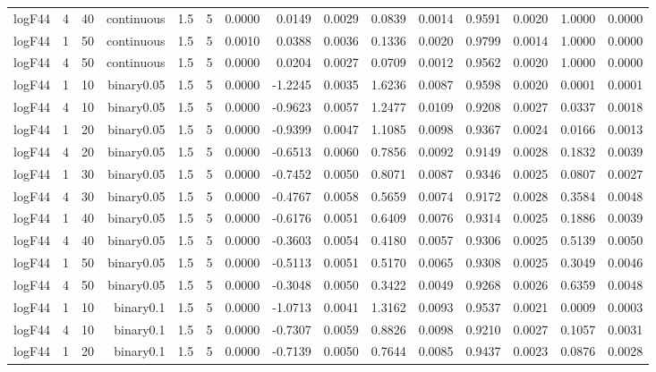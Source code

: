 \begin{longtable}{rrrrrrrrrrrrrrr}
  logF44 & 4 & 40 & continuous & 1.5 & 5 & 0.0000 & 0.0149 & 0.0029 & 0.0839 & 0.0014 & 0.9591 & 0.0020 & 1.0000 & 0.0000 \\ 
  logF44 & 1 & 50 & continuous & 1.5 & 5 & 0.0010 & 0.0388 & 0.0036 & 0.1336 & 0.0020 & 0.9799 & 0.0014 & 1.0000 & 0.0000 \\ 
  logF44 & 4 & 50 & continuous & 1.5 & 5 & 0.0000 & 0.0204 & 0.0027 & 0.0709 & 0.0012 & 0.9562 & 0.0020 & 1.0000 & 0.0000 \\ 
  logF44 & 1 & 10 & binary0.05 & 1.5 & 5 & 0.0000 & -1.2245 & 0.0035 & 1.6236 & 0.0087 & 0.9598 & 0.0020 & 0.0001 & 0.0001 \\ 
  logF44 & 4 & 10 & binary0.05 & 1.5 & 5 & 0.0000 & -0.9623 & 0.0057 & 1.2477 & 0.0109 & 0.9208 & 0.0027 & 0.0337 & 0.0018 \\ 
  logF44 & 1 & 20 & binary0.05 & 1.5 & 5 & 0.0000 & -0.9399 & 0.0047 & 1.1085 & 0.0098 & 0.9367 & 0.0024 & 0.0166 & 0.0013 \\ 
  logF44 & 4 & 20 & binary0.05 & 1.5 & 5 & 0.0000 & -0.6513 & 0.0060 & 0.7856 & 0.0092 & 0.9149 & 0.0028 & 0.1832 & 0.0039 \\ 
  logF44 & 1 & 30 & binary0.05 & 1.5 & 5 & 0.0000 & -0.7452 & 0.0050 & 0.8071 & 0.0087 & 0.9346 & 0.0025 & 0.0807 & 0.0027 \\ 
  logF44 & 4 & 30 & binary0.05 & 1.5 & 5 & 0.0000 & -0.4767 & 0.0058 & 0.5659 & 0.0074 & 0.9172 & 0.0028 & 0.3584 & 0.0048 \\ 
  logF44 & 1 & 40 & binary0.05 & 1.5 & 5 & 0.0000 & -0.6176 & 0.0051 & 0.6409 & 0.0076 & 0.9314 & 0.0025 & 0.1886 & 0.0039 \\ 
  logF44 & 4 & 40 & binary0.05 & 1.5 & 5 & 0.0000 & -0.3603 & 0.0054 & 0.4180 & 0.0057 & 0.9306 & 0.0025 & 0.5139 & 0.0050 \\ 
  logF44 & 1 & 50 & binary0.05 & 1.5 & 5 & 0.0000 & -0.5113 & 0.0051 & 0.5170 & 0.0065 & 0.9308 & 0.0025 & 0.3049 & 0.0046 \\ 
  logF44 & 4 & 50 & binary0.05 & 1.5 & 5 & 0.0000 & -0.3048 & 0.0050 & 0.3422 & 0.0049 & 0.9268 & 0.0026 & 0.6359 & 0.0048 \\ 
  logF44 & 1 & 10 & binary0.1 & 1.5 & 5 & 0.0000 & -1.0713 & 0.0041 & 1.3162 & 0.0093 & 0.9537 & 0.0021 & 0.0009 & 0.0003 \\ 
  logF44 & 4 & 10 & binary0.1 & 1.5 & 5 & 0.0000 & -0.7307 & 0.0059 & 0.8826 & 0.0098 & 0.9210 & 0.0027 & 0.1057 & 0.0031 \\ 
  logF44 & 1 & 20 & binary0.1 & 1.5 & 5 & 0.0000 & -0.7139 & 0.0050 & 0.7644 & 0.0085 & 0.9437 & 0.0023 & 0.0876 & 0.0028 \\ 

\end{longtable}
